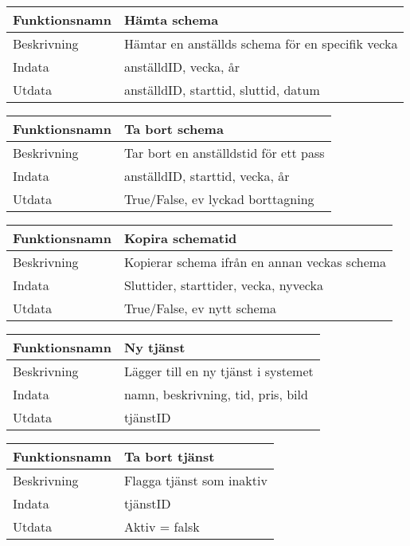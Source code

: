 \documentclass[11pt, titlepage, oneside, a4paper]{article}	%
\begin{document}
\begin{tabular}{ll}
\hline
Funktionsnamn & Hämta schema                 \\ \hline
Beskrivning   & Hämtar en anställds schema för en specifik vecka \\ \hline
Indata        & anställdID, vecka, år \\ \hline
Utdata        & anställdID, starttid, sluttid, datum  \\ \hline
\end{tabular}

\begin{tabular}{ll}
\hline
Funktionsnamn & Ta bort schema                 \\ \hline
Beskrivning   & Tar bort en anställdstid för ett pass \\ \hline
Indata        & anställdID, starttid, vecka, år \\ \hline
Utdata        & True/False, ev lyckad borttagning  \\ \hline
\end{tabular}

\begin{tabular}{ll}
\hline
Funktionsnamn & Kopira schematid                 \\ \hline
Beskrivning   & Kopierar schema ifrån en annan veckas schema \\ \hline
Indata        & Sluttider, starttider, vecka, nyvecka \\ \hline
Utdata        & True/False, ev nytt schema  \\ \hline
\end{tabular}

\begin{tabular}{ll}
\hline
Funktionsnamn & Ny tjänst              \\ \hline
Beskrivning   & Lägger till en ny tjänst i systemet \\ \hline
Indata        & namn, beskrivning, tid, pris, bild \\ \hline
Utdata        & tjänstID  \\ \hline
\end{tabular}

\begin{tabular}{ll}
\hline
Funktionsnamn & Ta bort tjänst              \\ \hline
Beskrivning   & Flagga tjänst som inaktiv \\ \hline
Indata        & tjänstID  \\ \hline
Utdata        & Aktiv = falsk  \\ \hline
\end{tabular}
\end{document}
